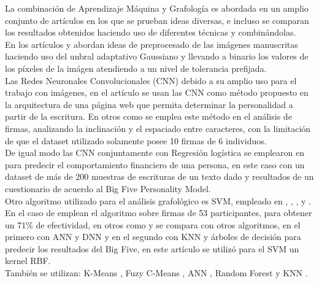 \documentclass[10pt, a4paper]{article}
\begin{document}
        La combinaci\'on de Aprendizaje M\'aquina y Grafolog\'ia es abordada en un amplio conjunto de art\'iculos en los que se prueban ideas diversas, e incluso se comparan los resultados obtenidos haciendo uso de
        diferentes t\'ecnicas y combin\'andolas.\\ 


        En los art\'iculos \cite{8769221} y \cite{CHITLANGIA2019384} abordan ideas de preprocesado de las im\'agenes manuscritas haciendo uso del unbral adaptativo Gaussiano y llevando a binario los valores de los p\'ixeles de la im\'agen atendiendo a un
        nivel de tolerancia prefijada.\\ 

        Las Redes Neuronales Convolucionales (CNN) debido a su amplio uso para el trabajo con im\'agenes, en el art\'iculo \cite{8769221} se usan las CNN como m\'etodo propuesto en la arquitectura de una p\'agina web que permita determinar la personalidad 
        a partir de la escritura. En otros como \cite{8769221} se emplea este m\'etodo en el an\'alisis de firmas, analizando la inclinaci\'on y el espaciado entre caracteres, con la limitaci\'on de que el dataset utilizado solamente posee 10 firmas de 6 individuos. \\ 

        De igual modo las CNN conjuntamente con Regresi\'on log\'istica se emplearon en \cite{THOMAS2020100315} para predecir el comportamiento financiero de una persona, en este caso con un dataset de más de 200 muestras de escrituras de un texto dado y resultados de un cuestionario de acuerdo al Big Five Personality Model.\\ 

        Otro algoritmo utilizado para el an\'alisis grafol\'ogico es SVM, empleado en \cite{CHITLANGIA2019384}, \cite{shete2019graphologist}, \cite{maliki2020personality}, \cite{hashemi2015graphology} y \cite{kurniawan2023framework}. En el caso de \cite{maliki2020personality} emplean el algoritmo sobre firmas de 53 participantes, para obtener un 71\% de efectividad, 
        en otros como \cite{shete2019graphologist} y \cite{kurniawan2023framework} se compara con otros algoritmos, en el primero con ANN y DNN y en el segundo con KNN y \'arboles de decisi\'on para predecir los resultados del Big Five, en este art\'iculo se utiliz\'o para el SVM un kernel RBF.\\ 

        Tambi\'en se utilizan: K-Means \cite{pathak2020personality}, Fuzy C-Means \cite{pratiwi2016personality}, ANN \cite{lokhande2017analysis,shete2019graphologist,champa2010artificial,pathak2020personality}, Random Forest \cite{likforman2017emothaw, ayzeren2019emotional} y KNN \cite{pathak2020personality,kurniawan2023framework}.\\
\end{document}
